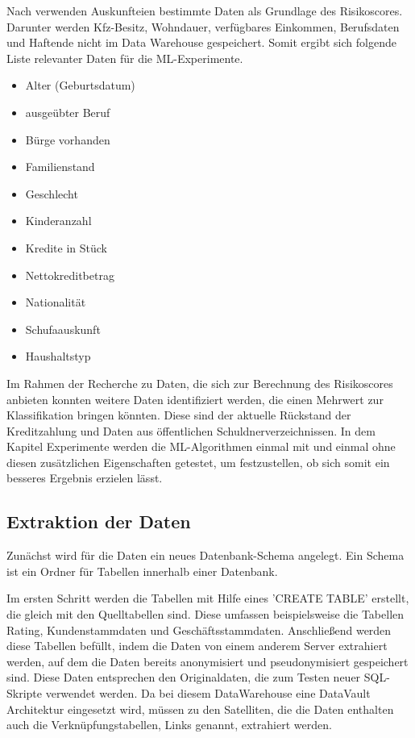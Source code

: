 
Nach \cite{sokol2005} verwenden Auskunfteien bestimmte Daten als Grundlage des Risikoscores. 
Darunter werden Kfz-Besitz, Wohndauer, verfügbares Einkommen, Berufsdaten und Haftende nicht im Data Warehouse gespeichert. 
Somit ergibt sich folgende Liste relevanter Daten für die ML-Experimente. 

\begin{itemize}
 \item Alter (Geburtsdatum)
 \item ausgeübter Beruf
 \item Bürge vorhanden
 \item Familienstand
 \item Geschlecht
 \item Kinderanzahl
 \item Kredite in Stück 
 \item Nettokreditbetrag 
 \item Nationalität
 \item Schufaauskunft
 \item Haushaltstyp
\end{itemize}


Im Rahmen der Recherche zu Daten, die sich zur Berechnung des Risikoscores anbieten konnten weitere Daten identifiziert werden, die einen Mehrwert zur Klassifikation bringen könnten. 
Diese sind der aktuelle Rückstand der Kreditzahlung und Daten aus öffentlichen Schuldnerverzeichnissen.
In dem Kapitel Experimente werden die ML-Algorithmen einmal mit und einmal ohne diesen zusätzlichen Eigenschaften getestet, um festzustellen, ob sich somit ein besseres Ergebnis erzielen lässt. 


\subsection{Extraktion der Daten}
Zunächst wird für die Daten ein neues Datenbank-Schema angelegt.
Ein Schema ist ein Ordner für Tabellen innerhalb einer Datenbank.

Im ersten Schritt werden die Tabellen mit Hilfe eines 'CREATE TABLE' erstellt, die gleich mit den Quelltabellen sind. 
Diese umfassen beispielsweise die Tabellen Rating, Kundenstammdaten und Geschäftsstammdaten. 
Anschließend werden diese Tabellen befüllt, indem die Daten von einem anderem Server extrahiert werden, auf dem die Daten bereits anonymisiert und pseudonymisiert gespeichert sind. 
Diese Daten entsprechen den Originaldaten, die zum Testen neuer SQL-Skripte verwendet werden. 
Da bei diesem DataWarehouse eine DataVault Architektur eingesetzt wird, müssen zu den Satelliten, die die Daten enthalten auch die Verknüpfungstabellen, Links genannt, extrahiert werden.  

